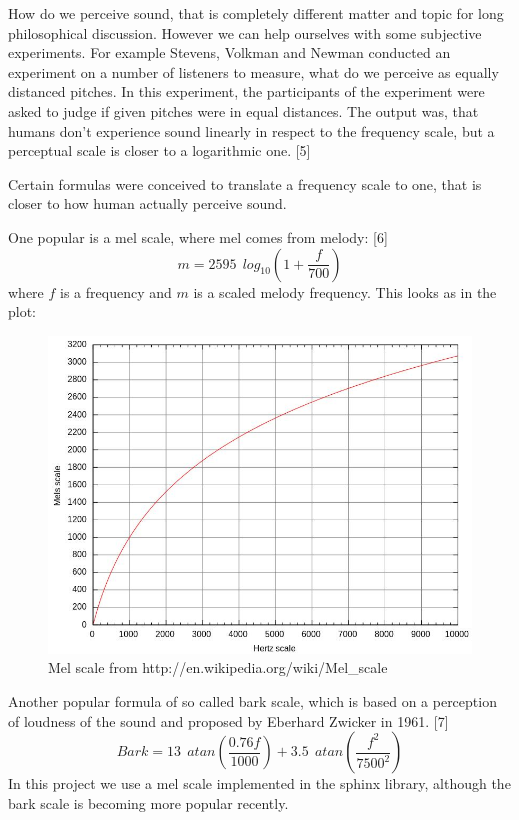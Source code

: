 \documentclass[12pt,a4paper,english]{article}
\begin{document}
How do we perceive sound, that is completely different matter and topic for long philosophical discussion. However we can help ourselves with some subjective experiments. For example Stevens, Volkman and Newman conducted an experiment on a number of listeners to measure, what do we perceive as equally distanced pitches. In this experiment, the participants of the experiment were asked to judge if given pitches were in equal distances. The output was, that humans don't experience sound linearly in respect to the frequency scale, but a perceptual scale is closer to a logarithmic one. [5] \newline

Certain formulas were conceived to translate a frequency scale to one, that is closer to how human actually perceive sound. \newline

One popular is a mel scale, where mel comes from melody: [6] \newline
\begin{equation}
    m = 2595 \: \: log_{10}(1 + \frac{f}{700})
\end{equation}
where $f$ is a frequency and $m$ is a scaled melody frequency. \newline
This looks as in the plot:
\begin{figure}[hb]
    \centering
    \includegraphics[scale=0.3]{mel_scale.jpg}
    \caption[]{Mel scale from http://en.wikipedia.org/wiki/Mel\_scale}
\end{figure}

Another popular formula of so called bark scale, which is based on a perception of loudness of the sound and proposed by Eberhard Zwicker in 1961. [7] \newline
\begin{equation}
    Bark = 13 \: \: atan(\frac{0.76f}{1000}) + 3.5 \: \: atan(\frac{f^2}{7500^2})
\end{equation}
In this project we use a mel scale implemented in the sphinx library, although the bark scale is becoming more popular recently.
\end{document}
